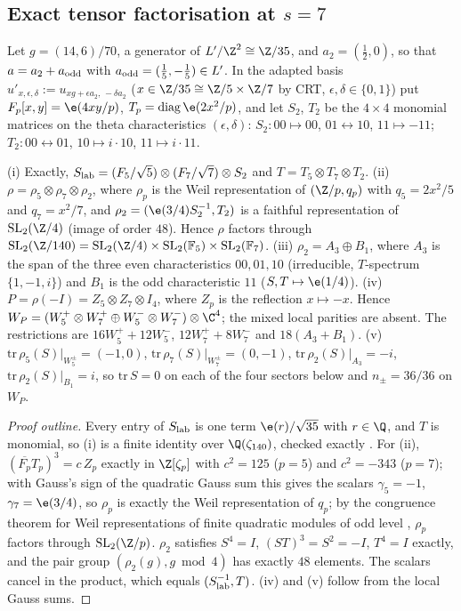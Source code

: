 \subsection{Exact tensor factorisation at $s=7$}
Let $g=(14,6)/70$, a generator of $L'/\Z^2\cong\Z/35$, and $a_2=(\tfrac12,0)$, so that $a=a_2+a_{\rm odd}$ with $a_{\rm odd}=(\tfrac15,-\tfrac15)\in L'$. In the
adapted basis $u'_{x,\epsilon,\delta}:=u_{xg+\epsilon a_2,\,-\delta a_2}$ ($x\in\Z/35\cong\Z/5\times\Z/7$ by CRT, $\epsilon,\delta\in\{0,1\}$) put
$F_p[x,y]=\e(4xy/p)$, $T_p=\mathrm{diag}\,\e(2x^2/p)$, and let $S_2$, $T_2$ be the $4\times4$ monomial matrices on the theta characteristics $(\epsilon,\delta)$:
$S_2:00\mapsto00$, $01\leftrightarrow10$, $11\mapsto-11$; $T_2:00\leftrightarrow01$, $10\mapsto i\cdot10$, $11\mapsto i\cdot11$.
\begin{theorem}[Tensor factorisation, $s=7$]\label{thm:tensor7}
(i) Exactly, $S_{\rm lab}=(F_5/\sqrt5)\otimes(F_7/\sqrt7)\otimes S_2$ and $T=T_5\otimes T_7\otimes T_2$.
(ii) $\rho=\rho_5\otimes\rho_7\otimes\rho_2$, where $\rho_p$ is the Weil representation of $(\Z/p,q_p)$ with $q_5=2x^2/5$ and $q_7=x^2/7$, and
$\rho_2=(\e(3/4)S_2^{-1},T_2)$ is a faithful representation of $\mathrm{SL}_2(\Z/4)$ (image of order $48$). Hence $\rho$ factors through
$\mathrm{SL}_2(\Z/140)=\mathrm{SL}_2(\Z/4)\times\mathrm{SL}_2(\mathbb F_5)\times\mathrm{SL}_2(\mathbb F_7)$.
(iii) $\rho_2=A_3\oplus B_1$, where $A_3$ is the span of the three even characteristics $00,01,10$ (irreducible, $T$-spectrum $\{1,-1,i\}$) and $B_1$ is the odd
characteristic $11$ ($S,T\mapsto\e(1/4)$).
(iv) $P=\rho(-I)=Z_5\otimes Z_7\otimes I_4$, where $Z_p$ is the reflection $x\mapsto-x$. Hence
$W_P=(W_5^+\otimes W_7^+\oplus W_5^-\otimes W_7^-)\otimes\C^4$; the mixed local parities are absent. The restrictions are $16W_5^++12W_5^-$,
$12W_7^++8W_7^-$ and $18(A_3+B_1)$.
(v) $\mathrm{tr}\,\rho_5(S)|_{W_5^\pm}=(-1,0)$, $\mathrm{tr}\,\rho_7(S)|_{W_7^\pm}=(0,-1)$, $\mathrm{tr}\,\rho_2(S)|_{A_3}=-i$, $\mathrm{tr}\,\rho_2(S)|_{B_1}=i$, so $\mathrm{tr}\,S=0$ on each of the
four sectors below and $n_\pm=36/36$ on $W_P$.
\end{theorem}
\begin{proof}[Proof outline]
Every entry of $S_{\rm lab}$ is one term $\e(r)/\sqrt{35}$ with $r\in\Q$, and $T$ is monomial, so (i) is a finite identity over $\Q(\zeta_{140})$, checked
exactly . For (ii), $(\overline{F_p}T_p)^3=c\,Z_p$ exactly in $\Z[\zeta_p]$ with $c^2=125$ ($p=5$) and $c^2=-343$ ($p=7$); with Gauss's sign of the quadratic
Gauss sum this gives the scalars $\gamma_5=-1$, $\gamma_7=\e(3/4)$, so $\rho_p$ is exactly the Weil representation of $q_p$; by the congruence theorem for Weil
representations of finite quadratic modules of odd level \cite{Weil}, $\rho_p$ factors through $\mathrm{SL}_2(\Z/p)$. $\rho_2$ satisfies $S^4=I$,
$(ST)^3=S^2=-I$, $T^4=I$ exactly, and the pair group $(\rho_2(g),g\bmod4)$ has exactly $48$ elements. The scalars cancel in the product, which equals
$(S_{\rm lab}^{-1},T)$. (iv) and (v) follow from the local Gauss sums.
\end{proof}
